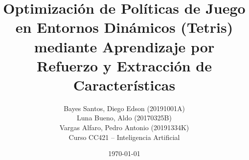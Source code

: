 \documentclass[11pt,a4paper]{article}
\title{Optimización de Políticas de Juego en Entornos Dinámicos (Tetris)\\
mediante Aprendizaje por Refuerzo y Extracción de Características}
\author{
Bayes Santos, Diego Edson (20191001A) \\
Luna Bueno, Aldo (20170325B) \\
Vargas Alfaro, Pedro Antonio (20191334K) \\[4pt]
Curso CC421 -- Inteligencia Artificial
}
\date{\today}
\begin{document}
\maketitle



















\nocite{*}


\end{document}
